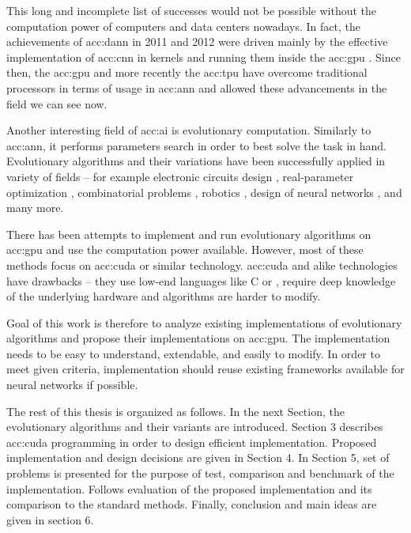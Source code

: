 This long and incomplete list of successes would not be possible without the computation power of computers and data centers nowadays. In fact, the achievements of \acrshort{acc:dann} in 2011 and 2012 were driven mainly by the effective implementation of \acrfull{acc:cnn} in kernels and running them inside the \acrfull{acc:gpu} \citep{CIRESAN2012333}. Since then, the \acrshort{acc:gpu} and more recently the \acrfull{acc:tpu} have overcome traditional processors in terms of usage in \acrshort{acc:ann} and allowed these advancements in the field we can see now.

Another interesting field of \acrlong{acc:ai} is evolutionary computation. Similarly to \acrshort{acc:ann}, it performs parameters search in order to best solve the task in hand. Evolutionary algorithms and their variations have been successfully applied in variety of fields -- for example 
electronic circuits design \citep{NASAantenaDesign}\allowbreak\citep{circuitdesignoptimizationea},
real-parameter optimization \citep{IntroNaturalEvolutionStrategies}, 
combinatorial problems \citep{GeneticAssambleLineBalancingProblem}\allowbreak\citep{ALBAYRAK20111313},\linebreak
robotics \citep{EvolutionaryRobotics}\allowbreak\citep{RoboticsInPhysX}\allowbreak\citep{nygaard2018realworld},
design of neural networks \citep{NEAT}\allowbreak\citep{Floreano2008NeuroevolutionFA},
and many more.

There has been attempts to implement and run evolutionary algorithms on \acrshort{acc:gpu} \citep{CHENG2019514} and use the computation power available. However, most of these methods focus on \acrfull{acc:cuda} or similar technology. \acrshort{acc:cuda} and alike technologies have drawbacks -- they use low-end languages like C or \cpp, require deep knowledge of the underlying hardware and algorithms are harder to modify.

Goal of this work is therefore to analyze existing implementations of evolutionary algorithms and propose their implementations on \acrshort{acc:gpu}. The implementation needs to be easy to understand, extendable, and easily to modify. In order to meet given criteria, implementation should reuse existing frameworks available for neural networks if possible.

The rest of this thesis is organized as follows. 
In the next Section, the evolutionary algorithms and their variants are introduced. 
Section 3 describes \acrshort{acc:cuda} programming in order to  design efficient implementation.
Proposed implementation and design decisions are given in Section 4. 
In Section 5, set of problems is presented for the purpose of test, comparison and benchmark of the implementation. Follows evaluation of the proposed implementation and its comparison to the standard methods.
Finally, conclusion and main ideas are given in section 6.
